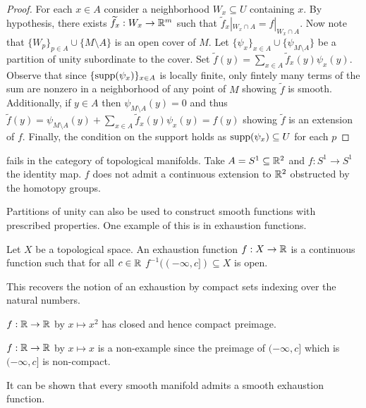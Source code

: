 \begin{proof}
    For each $x\in A$ consider a neighborhood $W_{x}\subseteq U$ containing $x$. By hypothesis, there exists $\widetilde{f}_{x}:W_{x}\to\mathbb{R}^{m}$ such that $\widetilde{f}_{x}|_{W_{x}\cap A}=f|_{W_{x}\cap A}$. Now note that $\{W_{p}\}_{p\in A}\cup\{M\setminus A\}$ is an open cover of $M$. Let $\{\psi_{x}\}_{x\in A}\cup\{\psi_{M\setminus A}\}$ be a partition of unity subordinate to the cover. Set $\widetilde{f}(y)=\sum_{x\in A}\widetilde{f}_{x}(y)\psi_{x}(y)$. Observe that since $\{\mathrm{supp}(\psi_{x})\}_{x\in A}$ is locally finite, only fintely many terms of the sum are nonzero in a neighborhood of any point of $M$ showing $\widetilde{f}$ is smooth. Additionally, if $y\in A$ then $\psi_{M\setminus A}(y)=0$ and thus $\widetilde{f}(y)=\psi_{M\setminus A}(y)+\sum_{x\in A}\widetilde{f}_{x}(y)\psi_{x}(y)=f(y)$ showing $\widetilde{f}$ is an extension of $f$. Finally, the condition on the support holds as $\mathrm{supp}(\psi_{x})\subseteq U$ for each $p$
\end{proof}
\begin{remark}
     fails in the category of topological manifolds. Take $A=S^{1}\subseteq\mathbb{R}^{2}$ and $f:S^{1}\to S^{1}$ the identity map. $f$ does not admit a continuous extension to $\mathbb{R}^{2}$ obstructed by the homotopy groups. 
\end{remark}
Partitions of unity can also be used to construct smooth functions with prescribed properties. One example of this is in exhaustion functions. 
\begin{definition}\label{def: exhaustion function}
    Let $X$ be a topological space. An exhaustion function $f:X\to\mathbb{R}$ is a continuous function such that for all $c\in\mathbb{R}$ $f^{-1}((-\infty,c])\subseteq X$ is open. 
\end{definition}
\begin{remark}
    This recovers the notion of an exhaustion by compact sets indexing over the natural numbers. 
\end{remark}
\begin{example}
    $f:\mathbb{R}\to\mathbb{R}$ by $x\mapsto x^{2}$ has closed and hence compact preimage. 
\end{example}
\begin{example}
    $f:\mathbb{R}\to\mathbb{R}$ by $x\mapsto x$ is a non-example since the preimage of $(-\infty,c]$ which is $(-\infty,c]$ is non-compact. 
\end{example}
It can be shown that every smooth manifold admits a smooth exhaustion function. 
